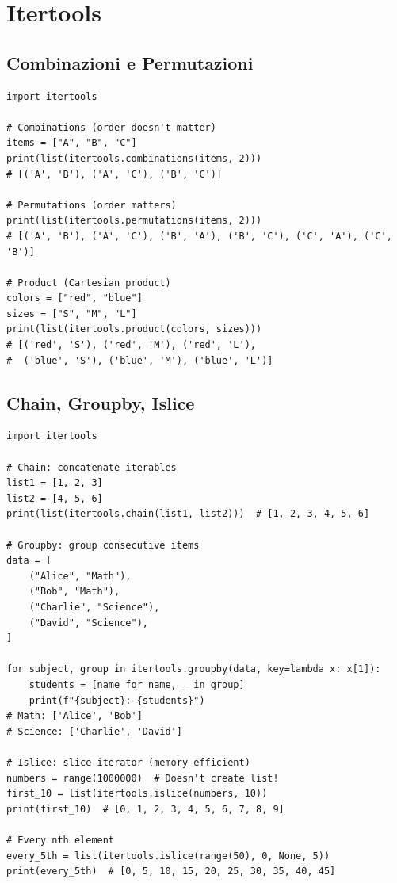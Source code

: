 \section{Itertools}

\subsection{Combinazioni e Permutazioni}

\begin{lstlisting}
import itertools

# Combinations (order doesn't matter)
items = ["A", "B", "C"]
print(list(itertools.combinations(items, 2)))
# [('A', 'B'), ('A', 'C'), ('B', 'C')]

# Permutations (order matters)
print(list(itertools.permutations(items, 2)))
# [('A', 'B'), ('A', 'C'), ('B', 'A'), ('B', 'C'), ('C', 'A'), ('C', 'B')]

# Product (Cartesian product)
colors = ["red", "blue"]
sizes = ["S", "M", "L"]
print(list(itertools.product(colors, sizes)))
# [('red', 'S'), ('red', 'M'), ('red', 'L'),
#  ('blue', 'S'), ('blue', 'M'), ('blue', 'L')]
\end{lstlisting}

\subsection{Chain, Groupby, Islice}

\begin{lstlisting}
import itertools

# Chain: concatenate iterables
list1 = [1, 2, 3]
list2 = [4, 5, 6]
print(list(itertools.chain(list1, list2)))  # [1, 2, 3, 4, 5, 6]

# Groupby: group consecutive items
data = [
    ("Alice", "Math"),
    ("Bob", "Math"),
    ("Charlie", "Science"),
    ("David", "Science"),
]

for subject, group in itertools.groupby(data, key=lambda x: x[1]):
    students = [name for name, _ in group]
    print(f"{subject}: {students}")
# Math: ['Alice', 'Bob']
# Science: ['Charlie', 'David']

# Islice: slice iterator (memory efficient)
numbers = range(1000000)  # Doesn't create list!
first_10 = list(itertools.islice(numbers, 10))
print(first_10)  # [0, 1, 2, 3, 4, 5, 6, 7, 8, 9]

# Every nth element
every_5th = list(itertools.islice(range(50), 0, None, 5))
print(every_5th)  # [0, 5, 10, 15, 20, 25, 30, 35, 40, 45]
\end{lstlisting}

